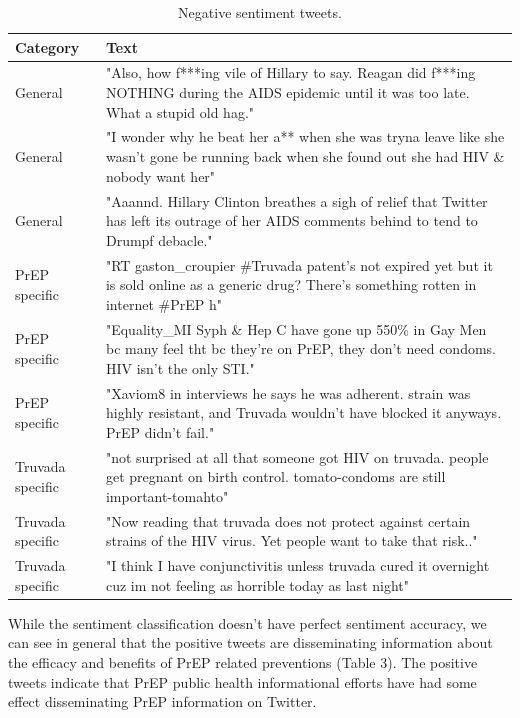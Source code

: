 \documentclass{sig-alternate-05-2015}
\begin{document}
\begin{table}
\centering
\caption{Negative sentiment tweets.}
\begin{tabular}{|p{2.5cm}|p{12cm}|} \hline
Category & Text\\ \hline
General & "Also, how f***ing vile of Hillary to say. Reagan did f***ing NOTHING during the AIDS epidemic until it was too late. What a stupid old hag."\\ \hline
General & "I wonder why he beat her a** when she was tryna leave like she wasn't gone be running back when she found out she had HIV \& nobody want her"\\ \hline
General & "Aaannd. Hillary Clinton breathes a sigh of relief that Twitter has left its outrage of her AIDS comments behind to tend to Drumpf debacle."\\ \hline

PrEP specific & "RT gaston\_croupier \#Truvada patent's not expired yet but it is sold online as a generic drug? There's something rotten in internet \#PrEP h"\\ \hline
PrEP specific & "Equality\_MI Syph \& Hep C have gone up 550\% in Gay Men bc many feel tht bc they're on PrEP, they don't need condoms. HIV isn't the only STI."\\ \hline
PrEP specific & "Xaviom8 in interviews he says he was adherent. strain was highly resistant, and Truvada wouldn't have blocked it anyways. PrEP didn't fail."\\ \hline

Truvada specific & "not surprised at all that someone got HIV on truvada. people get pregnant on birth control. tomato-condoms are still important-tomahto"\\ \hline
Truvada specific & "Now reading that truvada does not protect against certain strains of the HIV virus. Yet people want to take that risk.."\\ \hline
Truvada specific & "I think I have conjunctivitis unless truvada cured it overnight cuz im not feeling as horrible today as last night"\\ \hline

\hline\end{tabular}
\end{table}

While the sentiment classification doesn't have perfect sentiment accuracy, we can see in general that the positive tweets are disseminating information about the efficacy and benefits of PrEP related preventions (Table 3). The positive tweets indicate that PrEP public health informational efforts have had some effect disseminating PrEP information on Twitter. 
\end{document}
